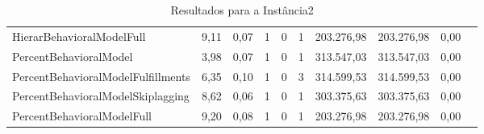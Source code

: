 \begin{table}[H]
{\begin{tabular}{lccccccccc}
            HierarBehavioralModelFull & 9,11 & 0,07 & 1 & 0 & 1 & 203.276,98 & 203.276,98 & 0,00 \\ 
            PercentBehavioralModel & 3,98 & 0,07 & 1 & 0 & 1 & 313.547,03 & 313.547,03 & 0,00 \\ 
            PercentBehavioralModelFulfillments & 6,35 & 0,10 & 1 & 0 & 3 & 314.599,53 & 314.599,53 & 0,00 \\ 
            PercentBehavioralModelSkiplagging & 8,62 & 0,06 & 1 & 0 & 1 & 303.375,63 & 303.375,63 & 0,00 \\ 
            PercentBehavioralModelFull & 9,20 & 0,08 & 1 & 0 & 1 & 203.276,98 & 203.276,98 & 0,00 \\ \hline
        \end{tabular}%
    }
    \caption{Resultados para a Instância2}
    \label{tab:resultado_instancia2}
\end{table}


